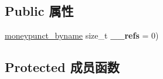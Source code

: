 \subsection*{Public 属性}
\begin{DoxyCompactItemize}
\item 
\mbox{\label{classmoneypunct__byname_3_01wchar__t_00_01false_01_4_a6e7857228deb3ca54ceff7f2cc100613}} 
\hyperlink{classmoneypunct__byname}{moneypunct\+\_\+byname} size\+\_\+t {\bfseries \+\_\+\+\_\+refs} = 0)
\end{DoxyCompactItemize}
\subsection*{Protected 成员函数}
